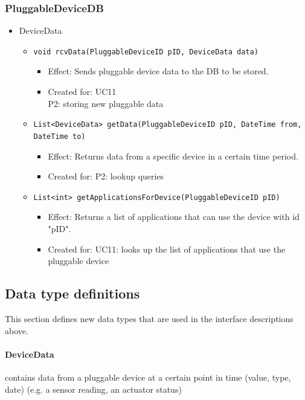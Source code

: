     \subsubsection{PluggableDeviceDB}
        \begin{itemize}
            \item DeviceData
            \begin{itemize}
                \item \texttt{void rcvData(PluggableDeviceID pID, DeviceData data)}
                \begin{itemize}
                    \item Effect: Sends pluggable device data to the DB to be stored.
                    \item Created for: UC11 \\
                          P2: storing new pluggable data
                \end{itemize}
                \item \texttt{List<DeviceData> getData(PluggableDeviceID pID, DateTime from, DateTime to)}
                \begin{itemize}
                    \item Effect: Returns data from a specific device in a certain time period.
                    \item Created for: P2: lookup queries
                \end{itemize}
                \item \texttt{List<int> getApplicationsForDevice(PluggableDeviceID pID)}
                \begin{itemize}
                    \item Effect: Returns a list of applications that can use the device with id "pID".
                    \item Created for: UC11: looks up the list of applications that use the pluggable device
                \end{itemize}
            \end{itemize}
        \end{itemize}


\subsection{Data type definitions}
    This section defines new data types that are used in the interface descriptions above.

    \paragraph{DeviceData}
               contains data from a pluggable device at a certain point in time
               (value, type, date) (e.g. a sensor reading, an actuator status)
